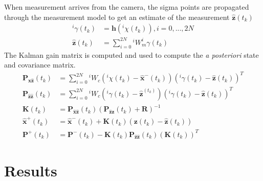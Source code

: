 \documentclass[letterpaper]{article}
\newcommand{\bb}[1]{\mathbf{#1}}
\begin{document}
When measurement arrives from the camera, the sigma points are
propagated through the measurement model to get an estimate of the
measurement $\bb{\hat{z}}(t_k)$
\begin{align}
^i \gamma(t_k) &= \bb{h}(^i \chi(t_k)), i=0,...,2N \\
\bb{\hat{z}}(t_k) &=\sum_{i=0}^{2N} \text{} ^iW_m ^i\gamma(t_k) \nonumber
\end{align}
The Kalman gain matrix is computed and used to compute the \emph{a
  posteriori} state and covariance matrix.
\begin{align}
\bb{P}_{\bb{\hat{x}\hat{z}}}(t_k)&=\sum_{i=0}^{2N} \text{} ^iW_c\left( ^i \chi(t_k) - \bb{\hat{x}}^-(t_k) \right) \left( ^i \gamma(t_k)- \bb{\hat{z}}(t_k) \right)^T \\
\bb{P}_{\bb{\hat{z}\hat{z}}}(t_k)&=\sum_{i=0}^{2N} \text{} ^iW_c\left( ^i \gamma(t_k) - \bb{\hat{z}}^(t_k) \right) \left( ^i \gamma(t_k)- \bb{\hat{z}}(t_k) \right)^T \nonumber \\
\bb{K}(t_k)&=\bb{P}_{\bb{\hat{x}\hat{z}}}(t_k) \left( \bb{P}_{\bb{\hat{z}\hat{z}}}(t_k) + \bb{R} \right)^{-1} \nonumber \\
\bb{\hat{x}}^+(t_k)&=\bb{\hat{x}}^-(t_k)+\bb{K}(t_k)\left( \bb{z}(t_k)-\bb{\hat{z}}(t_k) \right) \nonumber \\
\bb{P}^+(t_k)&=\bb{P}^-(t_k)-\bb{K}(t_k)\bb{P}_{\bb{\hat{z}\hat{z}}}(t_k)(\bb{K}(t_k))^T \nonumber
\end{align}





\section{Results}



\end{document}
